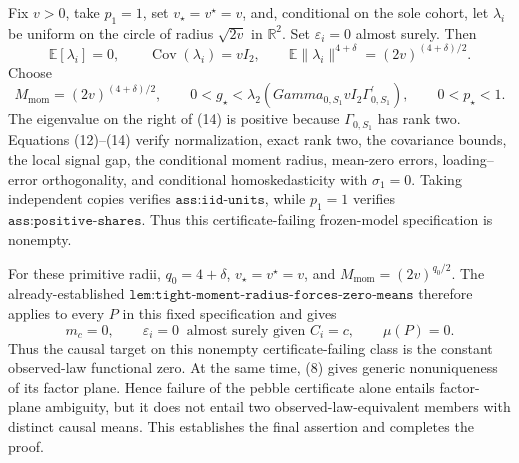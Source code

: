 Fix \(v>0\), take \(p_1=1\), set \(v_{\star}=v^{\star}=v\), and, conditional on the sole cohort, let \(\lambda_i\) be uniform on the circle of radius \(\sqrt{2v}\) in \(\mathbb R^2\). Set \(\varepsilon_i=0\) almost surely. Then
\[
\mathbb E[\lambda_i]=0,
\qquad
\operatorname{Cov}(\lambda_i)=vI_2,
\qquad
\mathbb E\|\lambda_i\|^{4+\delta}=(2v)^{(4+\delta)/2}.
\tag{13}
\]
Choose
\[
M_{\mathrm{mom}}=(2v)^{(4+\delta)/2},
\qquad
0<g_{\star}<\lambda_2\!\left(Gamma_{0,S_1}vI_2\Gamma_{0,S_1}^{\prime}\right),
\qquad
0<p_{\star}<1.
\tag{14}
\]
The eigenvalue on the right of (14) is positive because \(\Gamma_{0,S_1}\) has rank two. Equations (12)--(14) verify normalization, exact rank two, the covariance bounds, the local signal gap, the conditional moment radius, mean-zero errors, loading--error orthogonality, and conditional homoskedasticity with \(\sigma_1=0\). Taking independent copies verifies \(\texttt{ass:iid-units}\), while \(p_1=1\) verifies \(\texttt{ass:positive-shares}\). Thus this certificate-failing frozen-model specification is nonempty.

For these primitive radii, \(q_0=4+\delta\), \(v_{\star}=v^{\star}=v\), and \(M_{\mathrm{mom}}=(2v)^{q_0/2}\). The already-established \(\texttt{lem:tight-moment-radius-forces-zero-means}\) therefore applies to every \(P\) in this fixed specification and gives
\[
m_c=0,
\qquad
\varepsilon_i=0\ \text{ almost surely given }C_i=c,
\qquad
\mu(P)=0.
\tag{15}
\]
Thus the causal target on this nonempty certificate-failing class is the constant observed-law functional zero. At the same time, (8) gives generic nonuniqueness of its factor plane. Hence failure of the pebble certificate alone entails factor-plane ambiguity, but it does not entail two observed-law-equivalent members with distinct causal means. This establishes the final assertion and completes the proof.
